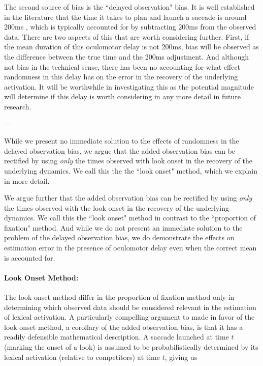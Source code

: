 \documentclass{article}
\begin{document}
The second source of bias is the ``delayed observation" bias. It is well established in the literature that the time it takes to plan and launch a saccade is around 200ms \cite{viviani1990time}, which is typically accounted for by subtracting 200ms from the observed data. There are two aspects of this that are worth considering further. First, if the mean duration of this oculomotor delay is not 200ms, bias will be observed as the difference between the true time and the 200ms adjustment. And although not bias in the technical sense, there has been no accounting for what effect randomness in this delay has on the error in the recovery of the underlying activation. It will be worthwhile in investigating this as the potential magnitude will determine if this delay is worth considering in any more detail in future research.

---

While we present no immediate solution to the effects of randomness in the delayed observation bias, we argue that the added observation bias can be rectified by using \textit{only} the times observed with look onset in the recovery of the underlying dynamics. We call this the the ``look onset" method, which we explain in more detail.

We argue further that the added observation bias can be rectified by using \textit{only} the times observed with the look onset in the recovery of the underlying dynamics. We call this the ``look onset" method in contrast to the ``proportion of fixation" method. And while we do not present an immediate solution to the problem of the delayed observation bias, we do demonstrate the effects on estimation error in the presence of oculomotor delay even when the correct mean is accounted for.


\paragraph{Look Onset Method:} The look onset method differ in the proportion of fixation method only in determining which observed data should be considered relevant in the estimation of lexical activation. A particularly compelling argument to made in favor of the look onset method, a corollary of the added observation bias, is that it has a readily defensible mathematical description. A saccade launched at time $t$ (marking the onset of a look) is assumed to be probabilistically determined by its lexical activation (relative to competitors) at time $t$, giving us
\end{document}
